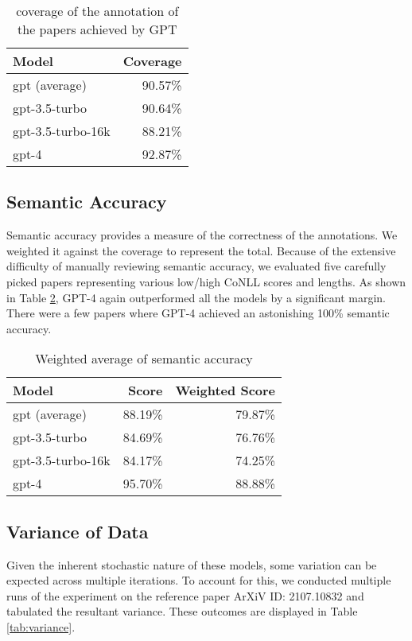 \begin{table}[htpb]
  \centering
  \begin{tabular}{lr}
    \hline
    Model & Coverage \\
    \hline
    gpt (average) & 90.57\% \\
    gpt-3.5-turbo & 90.64\% \\
    gpt-3.5-turbo-16k & 88.21\% \\
    gpt-4 & 92.87\% \\
    \hline
  \end{tabular}
  \caption[Total coverage]{coverage of the annotation of the papers achieved by GPT}
  \label{tab:anno-percentage}
\end{table}

\subsection{Semantic Accuracy}
Semantic accuracy provides a measure of the correctness of the annotations. We weighted it against the coverage to represent the total. Because of the extensive difficulty of manually reviewing semantic accuracy, we evaluated five carefully picked papers representing various low/high CoNLL scores and lengths. As shown in Table \ref{tab:semantic-accuracy}, GPT-4 again outperformed all the models by a significant margin. There were a few papers where GPT-4 achieved an astonishing 100\% semantic accuracy.

\begin{table}[htpb]
  \centering
  \begin{tabular}{lrr}
    \hline
    Model & Score & Weighted Score \\
    \hline
    gpt (average) & 88.19\% & 79.87\% \\
    gpt-3.5-turbo & 84.69\% & 76.76\% \\
    gpt-3.5-turbo-16k & 84.17\% & 74.25\% \\
    gpt-4 & 95.70\% & 88.88\% \\
    \hline
  \end{tabular}
  \caption[Semantic Accuracy]{Weighted average of semantic accuracy}
  \label{tab:semantic-accuracy}
\end{table}

\subsection{Variance of Data}
Given the inherent stochastic nature of these models, some variation can be expected across multiple iterations. To account for this, we conducted multiple runs of the experiment on the reference paper ArXiV ID: 2107.10832 \citep{singleton2021logic} and tabulated the resultant variance. These outcomes are displayed in Table \ref{tab:variance}.

